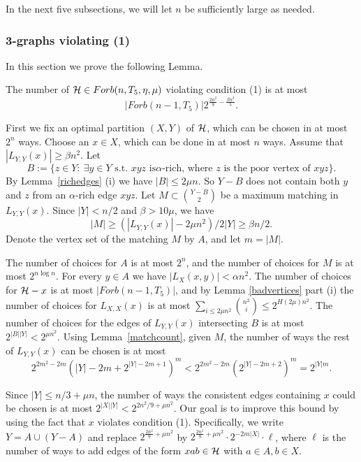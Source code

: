 \documentclass[11pt]{article}
\begin{document}
In the next five subsections, we will let $n$ be sufficiently large as needed.

\subsubsection{3-graphs  violating
(1)}  In this section we prove the following Lemma.

\begin{lemma} \label{1}
The number of  $\mathcal{H} \in Forb(n,T_5,\eta,\mu)$ violating condition (1)
is at most
$$|Forb(n-1,T_5)|2^{\frac{2n^2}{9} - \frac{\beta n^2}{5}}.$$
\end{lemma}
\proof
First we  fix an optimal partition $(X,Y)$ of $\mathcal{H}$, which
can be chosen in at most $2^n$ ways. Choose an $x\in X$, which can
be done in at most $n$ ways. Assume that $|L_{Y,Y}(x)|\ge \beta
n^2$. Let $$B:=\{z\in Y:\ \exists y\in Y \text{ s.t. } xyz \text{ is
}\alpha\text{-rich, where } z \text{ is the poor vertex of } xyz
\}.$$ By Lemma~\ref{richedges} (i) we have $|B|\le 2\mu n$. So $Y-B$
does not contain both $y$ and $z$ from  an $\alpha$-rich edge $xyz$.
Let $M \subset {Y-B \choose 2}$ be a maximum matching
in $L_{Y,Y}(x)$. Since $|Y|<n/2$ and $\beta>10\mu$, we have
  $$|M|\ge (|L_{Y,Y}(x)|-2\mu n^2)/2|Y|\ge
 \beta n/2.$$
  Denote the vertex set of the matching $M$  by $A$, and let  $m=|M|$.

   The number of choices for $A$  is at
   most $2^n$, and the number of choices for $M$
is at most $2^{n\log n}$.
 For every $y\in A$ we have
$|L_X(x,y)|<\alpha n^2.$ The number of choices for $\mathcal{H}-x$ is at
most $|Forb(n-1,T_5)|$, and by Lemma \ref{badvertices} part (i) the number of choices for $L_{X,X}(x)$ is
at
most $\sum_{i\le 2\mu n^2} \binom{n^2}{i}\le 2^{H(2\mu)n^2}$. The number of choices for  the edges of
$L_{Y,Y}(x)$ intersecting $B$ is at most $2^{|B||Y|}< 2^{\mu n^2}$.
Using Lemma~\ref{matchcount}, given $M$, the number of ways the rest
of $L_{Y,Y}(x)$ can be chosen is at most
$$2^{2m^2-2m} (|Y|-2m + 2^{|Y|-2m+1})^{m}<2^{2m^2-2m} (2^{|Y|-2m+2})^{m}= 2^{|Y|m}.$$

Since $|Y|\le n/3+ \mu n$, the number of ways the consistent edges containing $x$ could be chosen is at most
 $2^{|X||Y|}<2^{2n^2/9+\mu n^2}$. Our goal is to improve this bound by using the fact  that $x$ violates condition (1).
  Specifically, we write $Y=A \cup (Y-A)$ and replace $2^{\frac{2n^2}{9}+\mu n^2}$ by
 $2^{\frac{2n^2}{9}+\mu n^2}\cdot 2^{-2m|X|}\cdot \ell$, where $\ell$ is the number of ways to
  add edges of the form $xab\in \mathcal{H}$ with $a\in A, b\in X$.
\end{document}
